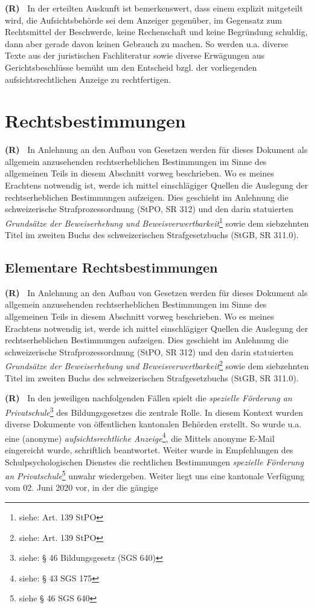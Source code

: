 \documentclass[paper=a4,fontsize=12pt, oneside, numbers=noenddot]{scrbook}
\newcounter{rz}
\newcommand{\Rz}{
	\addtocounter{rz}{1}\textbf{(R\arabic{rz})~}
}
\begin{document}
\Rz In der erteilten Auskunft ist bemerkenswert, dass einem  explizit mitgeteilt wird, die Aufsichtsbehörde sei dem Anzeiger gegenüber, im Gegensatz zum Rechtsmittel der Beschwerde, keine Rechenschaft und keine Begründung schuldig, dann aber gerade davon keinen Gebrauch zu machen. So werden u.a. diverse Texte aus der juristischen Fachliteratur sowie diverse Erwägungen aus Gerichtsbeschlüsse bemüht um den Entscheid bzgl. der vorliegenden aufsichtsrechtlichen Anzeige zu rechtfertigen.



\chapter{Rechtsbestimmungen}
\Rz In Anlehnung an den Aufbau von Gesetzen werden für dieses Dokument als allgemein anzusehenden rechtserheblichen Bestimmungen im Sinne des allgemeinen Teils in diesem Abschnitt vorweg beschrieben. Wo es meines Erachtens notwendig ist, werde ich mittel einschlägiger Quellen die Auslegung der rechtserheblichen Bestimmungen aufzeigen. Dies geschieht im Anlehnung die schweizerische Strafprozessordnung (StPO, SR 312) und den darin statuierten \textit{Grundsätze der Beweiserhebung und Beweisverwertbarkeit}\footnote{siehe: Art. 139 StPO} sowie dem siebzehnten Titel im zweiten Buchs des schweizerischen Strafgesetzbuchs (StGB, SR 311.0).


\section{Elementare Rechtsbestimmungen}
\Rz In Anlehnung an den Aufbau von Gesetzen werden für dieses Dokument als allgemein anzusehenden rechtserheblichen Bestimmungen im Sinne des allgemeinen Teils in diesem Abschnitt vorweg beschrieben. Wo es meines Erachtens notwendig ist, werde ich mittel einschlägiger Quellen die Auslegung der rechtserheblichen Bestimmungen aufzeigen. Dies geschieht im Anlehnung die schweizerische Strafprozessordnung (StPO, SR 312) und den darin statuierten \textit{Grundsätze der Beweiserhebung und Beweisverwertbarkeit}\footnote{siehe: Art. 139 StPO} sowie dem siebzehnten Titel im zweiten Buchs des schweizerischen Strafgesetzbuchs (StGB, SR 311.0).



\Rz In den jeweiligen nachfolgenden Fällen spielt die \textit{spezielle Förderung an Privatschule}\footnote{siehe: § 46 Bildungsgesetz (SGS 640)}  des Bildungsgesetzes die zentrale Rolle. In diesem Kontext wurden diverse Dokumente von öffentlichen kantonalen Behörden erstellt. So wurde u.a. eine (anonyme) \textit{aufsichtsrechtliche Anzeige}\footnote{siehe: § 43 SGS 175}, die Mittels anonyme E-Mail eingereicht wurde, schriftlich beantwortet. Weiter wurde in Empfehlungen des Schulpsychologischen Dienstes die rechtlichen Bestimmungen \textit{spezielle Förderung an Privatschule}\footnote{siehe § 46 SGS 640} unwahr wiedergeben. Weiter liegt uns eine kantonale Verfügung vom 02. Juni 2020 vor, in der die gängige 
\end{document}
